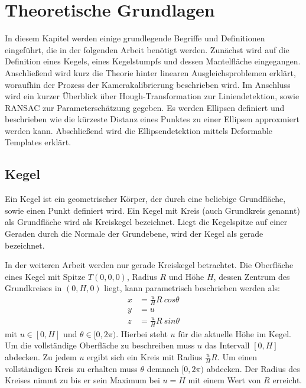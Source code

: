 \chapter{Theoretische Grundlagen}
\label{ch:theory}
In diesem Kapitel werden einige grundlegende Begriffe und Definitionen eingeführt, die in der folgenden Arbeit benötigt werden.
Zunächst wird auf die Definition eines Kegels, eines Kegelstumpfs und dessen Mantelfläche eingegangen.
Anschließend wird kurz die Theorie hinter linearen Ausgleichsproblemen erklärt, woraufhin der Prozess der Kamerakalibrierung
beschrieben wird.
Im Anschluss wird ein kurzer Überblick über Hough-Transformation zur Liniendetektion, sowie RANSAC zur Parameterschätzung gegeben.
Es werden Ellipsen definiert und beschrieben wie die kürzeste Distanz eines Punktes zu einer Ellipsen approxmiert werden kann.
Abschließend wird die Ellipsendetektion mittels Deformable Templates erklärt.

\section{Kegel}
\label{s:cone}

\begin{definition}[Kegel]
	Ein Kegel ist ein geometrischer Körper, der durch eine beliebige Grundfläche, sowie einen Punkt definiert wird.
	Ein Kegel mit Kreis (auch Grundkreis genannt) als Grundfläche wird als Kreiskegel bezeichnet. Liegt die Kegelspitze auf einer Geraden durch die Normale der Grundebene, wird der Kegel als gerade bezeichnet.
\end{definition}

In der weiteren Arbeit werden nur gerade Kreiskegel betrachtet. Die Oberfläche eines Kegel mit Spitze $T(0,0,0)$, Radius $R$ und Höhe $H$, dessen Zentrum des Grundkreises in $(0,H,0)$ liegt, kann parametrisch beschrieben werden als:
\begin{equation} \label{eq:paramCone}
\begin{aligned}
x &= \frac{u}{H} R~cos \theta \\
y &= u \\
z &= \frac{u}{H} R~sin \theta
\end{aligned}
\end{equation} %
mit $u\in [0, H]$ und $\theta \in [0, 2\pi)$. Hierbei steht $u$ für die aktuelle Höhe im Kegel. Um die vollständige Oberfläche zu beschreiben muss $u$ das Intervall $[0, H]$ abdecken. Zu jedem $u$ ergibt sich ein Kreis mit Radius $\frac{u}{H} R$. Um einen vollständigen Kreis zu erhalten muss $\theta$ demnach $[0, 2\pi)$ abdecken. Der Radius des Kreises nimmt zu bis er sein Maximum bei $u = H$ mit einem Wert von $R$ erreicht.


